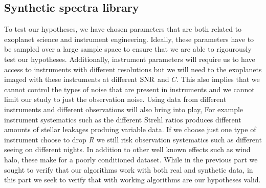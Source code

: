 \subsection{Synthetic spectra library}
To test our hypotheses, we have chosen parameters that are both related to exoplanet science and instrument engineering.
Ideally, these parameters have to be sampled over a large sample space to ensure that we are able to rigourously test our hypotheses.
Additionally, instrument parameters will require us to have access to instruments with different resolutions but we will need to the exoplanets imaged with these instruments at different $\rm{SNR}$ and $C$.
This also implies that we cannot control the types of noise that are present in instruments and we cannot limit our study to just the observation noise.
Using data from different instruments and different observations will also bring into play,
For example instrument systematics such as the different Strehl ratios produces different amounts of stellar leakages produing variable data.
If we choose just one type of instrument choose to drop $R$ we still risk observation systematics such as different seeing on different nights. 
In addition to other well known effects such as wind halo, these make for a poorly conditioned dataset. 
While in the previous part we sought to verify that our algorithms work with both real and synthetic data, in this part we seek to verify that with working algorithms are our hypotheses valid.

